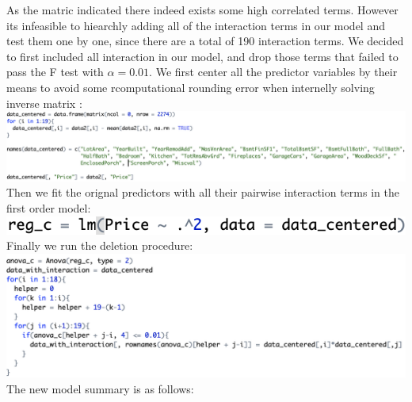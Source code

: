 \documentclass{article}
\begin{document}
As the matric indicated there indeed exists some high correlated terms. However its infeasible to hiearchly adding all of the interaction terms in our model and test them one by one, since there are a total of 190 interaction terms. We decided to first included all interaction in our model, and drop those terms that failed to pass the F test with $\alpha = 0.01$. We first center all the predictor variables by their means to avoid some rcomputational rounding error when internelly solving inverse matrix :\\
\includegraphics[scale = 0.5]{code1.png}\\
Then we fit the orignal predictors with all their pairwise interaction terms in the first order model:\\
\includegraphics[scale = 0.5]{code2.png}\\
Finally we run the deletion procedure:\\
\includegraphics[scale = 0.5]{code3.png}\\
The new model summary is as follows:\\
\end{document}
